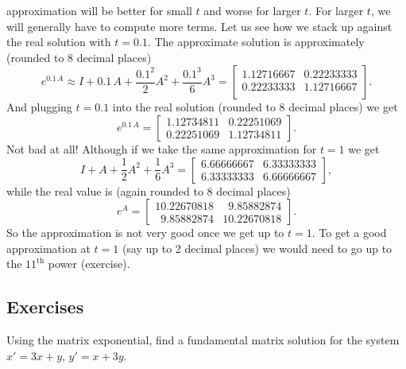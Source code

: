 \documentclass[12pt]{book}
\begin{document}
approximation will be better for small $t$ and worse for larger $t$.  For
larger $t$, we will generally have to compute more terms.
Let us see how we stack up against the real solution with $t=0.1$.  The
approximate solution is approximately (rounded to 8 decimal places)
\begin{equation*}
e^{0.1\,A} \approx
I + 0.1\,A + \frac{0.1^2}{2}A^2 + \frac{0.1^3}{6}A^3
=
\begin{bmatrix}
1.12716667 & 0.22233333 \\
0.22233333 & 1.12716667 \\
\end{bmatrix} .
\end{equation*}
And plugging $t=0.1$ into the real solution (rounded to 8 decimal places) we get
\begin{equation*}
e^{0.1\,A} = 
\begin{bmatrix}
1.12734811 & 0.22251069 \\
0.22251069 & 1.12734811
\end{bmatrix} .
\end{equation*}
Not bad at all!  Although if we take the same approximation for $t=1$
we get
\begin{equation*}
I + A + \frac{1}{2}A^2 + \frac{1}{6}A^3
=
\begin{bmatrix}
6.66666667 & 6.33333333 \\
6.33333333 & 6.66666667
\end{bmatrix} ,
\end{equation*}
while the real value is (again rounded to 8 decimal places)
\begin{equation*}
e^{A} =
\begin{bmatrix}
10.22670818           & \phantom{0}9.85882874 \\
\phantom{0}9.85882874 & 10.22670818
\end{bmatrix} .
\end{equation*}
So the approximation is not very good once we get up to $t=1$.  To get a good
approximation at $t=1$ (say up to 2 decimal places) we would need to go up to
the ${11}^{\text{th}}$ power (exercise).

\subsection{Exercises}

\begin{exercise}
Using the matrix exponential,
find a fundamental matrix solution for the system
$x' = 3x+y$, $y' = x+3y$.
\end{exercise}
\end{document}
